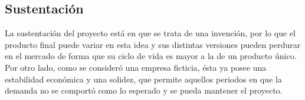 \subsection{Sustentación}

La sustentación del proyecto está en que se trata de una invención, por lo que el producto final puede variar en esta idea y sus distintas versiones pueden perdurar en el mercado de forma que su ciclo de vida es mayor a la de un producto único. Por otro lado, como se consideró una empresa ficticia, ésta ya posee una estabilidad económica y una solidez, que permite aquellos periodos en que la demanda no se comportó como lo esperado y se pueda mantener el proyecto.
